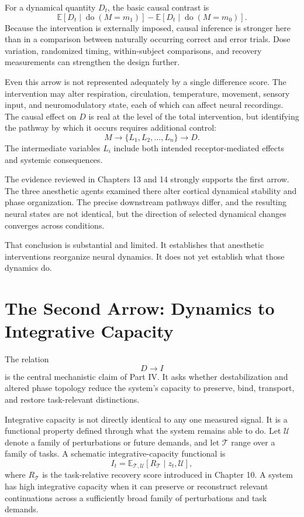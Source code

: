 \documentclass[11pt]{book}
\begin{document}
For a dynamical quantity $D_t$, the basic causal contrast is
\[
\mathbb E[D_t\mid\operatorname{do}(M=m_1)]
-
\mathbb E[D_t\mid\operatorname{do}(M=m_0)].
\]
Because the intervention is externally imposed, causal inference is stronger here than in a comparison between naturally occurring correct and error trials. Dose variation, randomized timing, within-subject comparisons, and recovery measurements can strengthen the design further.

Even this arrow is not represented adequately by a single difference score. The intervention may alter respiration, circulation, temperature, movement, sensory input, and neuromodulatory state, each of which can affect neural recordings. The causal effect on $D$ is real at the level of the total intervention, but identifying the pathway by which it occurs requires additional control:
\[
M\longrightarrow
\{L_1,L_2,\ldots,L_n\}
\longrightarrow D.
\]
The intermediate variables $L_i$ include both intended receptor-mediated effects and systemic consequences.

The evidence reviewed in Chapters 13 and 14 strongly supports the first arrow. The three anesthetic agents examined there alter cortical dynamical stability and phase organization. The precise downstream pathways differ, and the resulting neural states are not identical, but the direction of selected dynamical changes converges across conditions.

That conclusion is substantial and limited. It establishes that anesthetic interventions reorganize neural dynamics. It does not yet establish what those dynamics do.

\section*{The Second Arrow: Dynamics to Integrative Capacity}

The relation
\[
D\longrightarrow I
\]
is the central mechanistic claim of Part IV. It asks whether destabilization and altered phase topology reduce the system's capacity to preserve, bind, transport, and restore task-relevant distinctions.

Integrative capacity is not directly identical to any one measured signal. It is a functional property defined through what the system remains able to do. Let $\mathcal U$ denote a family of perturbations or future demands, and let $\mathcal T$ range over a family of tasks. A schematic integrative-capacity functional is
\[
I_t
=
\mathbb E_{\mathcal T,\mathcal U}
\left[
R_{\mathcal T}
\mid
z_t,\mathcal U
\right],
\]
where $R_{\mathcal T}$ is the task-relative recovery score introduced in Chapter 10. A system has high integrative capacity when it can preserve or reconstruct relevant continuations across a sufficiently broad family of perturbations and task demands.
\end{document}
